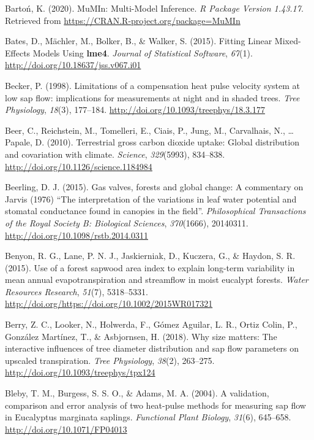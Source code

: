 \documentclass[11pt,twoside]{reedthesis}
\begin{document}
\hypertarget{ref-barton_mumin_2020}{}
Bartoń, K. (2020). MuMIn: Multi-Model Inference. \emph{R Package Version
1.43.17}. Retrieved from \url{https://CRAN.R-project.org/package=MuMIn}

\hypertarget{ref-Bates2015}{}
Bates, D., Mächler, M., Bolker, B., \& Walker, S. (2015). Fitting Linear
Mixed-Effects Models Using \textbf{lme4}. \emph{Journal of Statistical
Software}, \emph{67}(1). \url{http://doi.org/10.18637/jss.v067.i01}

\hypertarget{ref-Becker1998}{}
Becker, P. (1998). Limitations of a compensation heat pulse velocity
system at low sap flow: implications for measurements at night and in
shaded trees. \emph{Tree Physiology}, \emph{18}(3), 177--184.
\url{http://doi.org/10.1093/treephys/18.3.177}

\hypertarget{ref-Beer2010}{}
Beer, C., Reichstein, M., Tomelleri, E., Ciais, P., Jung, M.,
Carvalhais, N., \ldots{} Papale, D. (2010). Terrestrial gross carbon
dioxide uptake: Global distribution and covariation with climate.
\emph{Science}, \emph{329}(5993), 834--838.
\url{http://doi.org/10.1126/science.1184984}

\hypertarget{ref-beerling_gas_2015}{}
Beerling, D. J. (2015). Gas valves, forests and global change: A
commentary on Jarvis (1976) ``The interpretation of the variations in
leaf water potential and stomatal conductance found in canopies in the
field''. \emph{Philosophical Transactions of the Royal Society B:
Biological Sciences}, \emph{370}(1666), 20140311.
\url{http://doi.org/10.1098/rstb.2014.0311}

\hypertarget{ref-Benyon2015}{}
Benyon, R. G., Lane, P. N. J., Jaskierniak, D., Kuczera, G., \& Haydon,
S. R. (2015). Use of a forest sapwood area index to explain long-term
variability in mean annual evapotranspiration and streamflow in moist
eucalypt forests. \emph{Water Resources Research}, \emph{51}(7),
5318--5331. \url{http://doi.org/https://doi.org/10.1002/2015WR017321}

\hypertarget{ref-berry2018}{}
Berry, Z. C., Looker, N., Holwerda, F., Gómez Aguilar, L. R., Ortiz
Colin, P., González Martínez, T., \& Asbjornsen, H. (2018). Why size
matters: The interactive influences of tree diameter distribution and
sap flow parameters on upscaled transpiration. \emph{Tree Physiology},
\emph{38}(2), 263--275. \url{http://doi.org/10.1093/treephys/tpx124}

\hypertarget{ref-Bleby2004}{}
Bleby, T. M., Burgess, S. S. O., \& Adams, M. A. (2004). A validation,
comparison and error analysis of two heat-pulse methods for measuring
sap flow in Eucalyptus marginata saplings. \emph{Functional Plant
Biology}, \emph{31}(6), 645--658. \url{http://doi.org/10.1071/FP04013}
\end{document}

